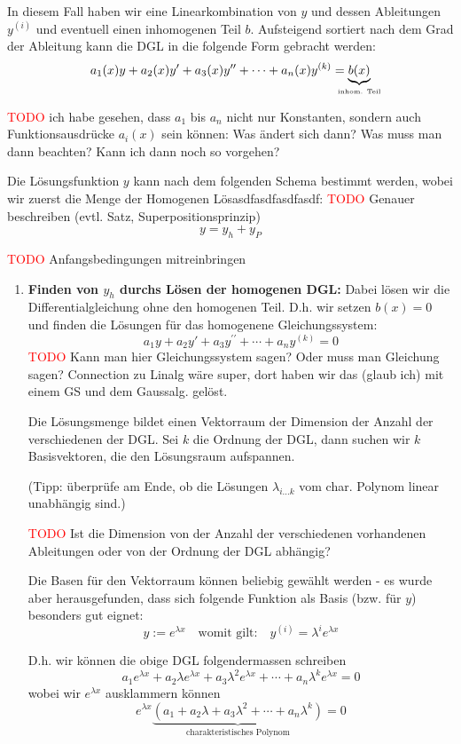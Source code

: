 \documentclass[a4paper,landscape,8pt]{extarticle}
\newcommand{\todo}{\textcolor{red}{TODO }}
\begin{document}
\begin{multicols*}{4}
\begin{warmup}
\begin{warmup}
In diesem Fall haben wir eine Linearkombination von $y$ und dessen Ableitungen
$y^{(i)}$ und eventuell einen inhomogenen Teil $b$. Aufsteigend sortiert nach dem
Grad der Ableitung kann die DGL in die folgende Form gebracht werden:
\[
a_1(x) y + a_2(x)y' + a_3(x)y^{\prime\prime} + \cdots + a_n(x)y^{(k)} =
\underbrace{b(x)}_{\makebox[0pt]{\text{\tiny inhom. Teil}}}
\]

\todo ich habe gesehen, dass $a_1$ bis $a_n$ nicht nur Konstanten, sondern auch
Funktionsausdrücke $a_i(x)$ sein können: Was ändert sich dann? Was muss man
dann beachten? Kann ich dann noch so vorgehen?

Die Lösungsfunktion $y$ kann nach dem folgenden Schema bestimmt werden, wobei
wir zuerst die Menge der Homogenen Lösasdfasdfasdfasdf:
\todo Genauer beschreiben (evtl. Satz, Superpositionsprinzip)
\[
y = y_h + y_P
\]

\todo Anfangsbedingungen mitreinbringen

\begin{enumerate}[label=(\arabic*)]
  \item \textbf{Finden von $y_h$ durchs Lösen der homogenen DGL:} Dabei lösen
  wir die Differentialgleichung ohne den homogenen Teil. D.h. wir setzen
  $b(x)=0$ und finden die Lösungen für das homogenene Gleichungssystem:
  \[
a_1 y + a_2y' + a_3y^{\prime\prime} + \cdots + a_ny^{(k)} = 0
  \]
  \todo{Kann man hier Gleichungssystem sagen? Oder muss man Gleichung sagen?
  Connection zu Linalg wäre super, dort haben wir das (glaub ich) mit einem GS
  und dem Gaussalg. gelöst.}
  
  Die Lösungsmenge bildet einen Vektorraum der Dimension der Anzahl der
  verschiedenen  der DGL. Sei $k$ die Ordnung der DGL, dann suchen wir $k$
  Basisvektoren, die den Lösungsraum aufspannen.
  
  (Tipp: überprüfe am Ende, ob die Lösungen $\lambda_{i\ldots k}$ vom char.
  Polynom linear unabhängig sind.)
  
  \todo{Ist die Dimension von der Anzahl der verschiedenen vorhandenen
  Ableitungen oder von der Ordnung der DGL abhängig?}
  
  Die Basen für den Vektorraum können beliebig gewählt werden - es wurde aber
  herausgefunden, dass sich folgende Funktion als Basis (bzw. für $y$) besonders
  gut eignet:
  \[
  y:=e^{\lambda x} \quad \text{womit gilt:} \quad y^{(i)} =
  \lambda^{i}e^{\lambda x}
  \]
  
  D.h. wir können die obige DGL folgendermassen schreiben
  \[
  a_1 e^{\lambda x} + a_2\lambda e^{\lambda x} + a_3\lambda^2e^{\lambda x} +
  \cdots + a_n\lambda^{k}e^{\lambda x} = 0
  \]
  wobei wir $e^{\lambda x}$ ausklammern können
  \[
  e^{\lambda x}\underbrace{(a_1 + a_2\lambda  + a_3\lambda^2 + \cdots +
  a_n\lambda^{k})}_{\text{charakteristisches Polynom}} = 0
  \]
  

\end{enumerate}
\end{warmup}
\end{warmup}
\end{multicols*}
\end{document}
